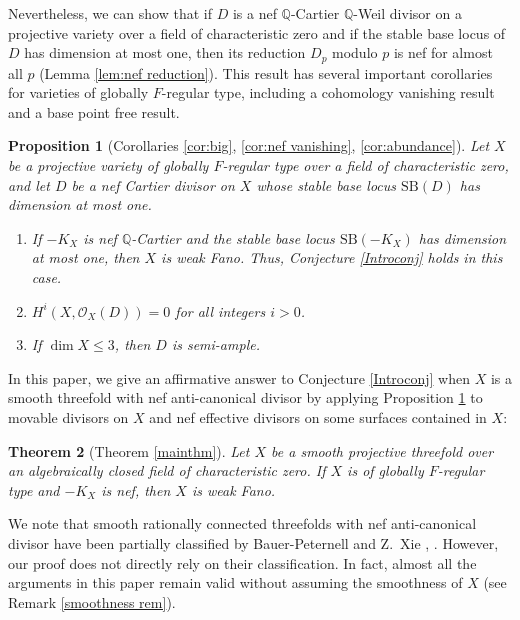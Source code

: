 \documentclass[12pt]{amsart}
\def\le{\leqslant}
\newcommand{\Q}{\mathbb{Q}}
\newcommand{\sO}{\mathcal{O}}
\theoremstyle{plain}
\theoremstyle{definition}
\theoremstyle{remark}
\newtheorem{defn and notation}[thm]{Definition and Notation}
\theoremstyle{plain}
\newtheorem{theo}{Theorem}
\newtheorem{PROP}[theo]{Proposition}
\begin{document}
Nevertheless, we can show that if $D$ is a nef $\Q$-Cartier $\Q$-Weil divisor on a projective variety over a field of characteristic zero and if the stable base locus of $D$ has dimension at most one, then its reduction $D_p$ modulo $p$ is nef for almost all $p$ (Lemma \ref{lem:nef reduction}). 
This result has several important corollaries for varieties of globally $F$-regular type, including a cohomology vanishing result and a base point free result. 

\begin{PROP}[Corollaries \ref{cor:big}, \ref{cor:nef vanishing}, \ref{cor:abundance}]\label{Introprop}
Let $X$ be a projective variety of globally $F$-regular type over a field of characteristic zero, and let $D$ be a nef Cartier divisor on $X$ whose stable base locus $\mathrm{SB}(D)$ has dimension at most one. 
\begin{enumerate}[label=$(\arabic*)$]
\item
If $-K_X$ is nef $\Q$-Cartier and the stable base locus $\mathrm{SB}(-K_X)$ has dimension at most one, then $X$ is weak Fano. 
Thus, Conjecture \ref{Introconj} holds in this case. 
\item 
$H^i(X, \sO_X(D))=0$ for all integers $i>0$. 
\item 
If $\dim X \le 3$,  then $D$ is semi-ample. 
\end{enumerate}
\end{PROP}

In this paper, we give an affirmative answer to Conjecture \ref{Introconj} when $X$ is a smooth threefold with nef anti-canonical divisor by applying Proposition \ref{Introprop} to movable divisors on $X$ and nef effective divisors on some surfaces contained in $X$:

\begin{theo}[Theorem \ref{mainthm}]\label{Introthm}
Let $X$ be a smooth projective threefold over an algebraically closed field of characteristic zero.
If $X$ is of globally $F$-regular type and $-K_X$ is nef, then $X$ is weak Fano.
\end{theo}



We note that smooth rationally connected threefolds with nef anti-canonical divisor have been partially classified by Bauer-Peternell \cite{Bauer-Peternell} and Z.~Xie \cite{Xie20}, \cite{Xie23}. 
However, our proof does not directly rely on their classification. 
In fact, almost all the arguments in this paper remain valid without assuming the smoothness of $X$ (see Remark \ref{smoothness rem}). 
\end{document}
